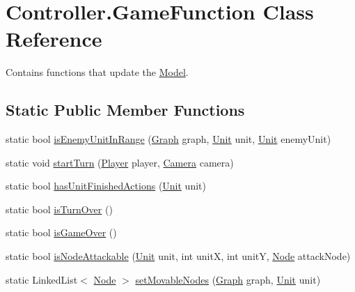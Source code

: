 \hypertarget{class_controller_1_1_game_function}{}\section{Controller.\+Game\+Function Class Reference}
\label{class_controller_1_1_game_function}


Contains functions that update the \hyperlink{namespace_model}{Model}.  


\subsection*{Static Public Member Functions}
\begin{DoxyCompactItemize}
\item 
static bool \hyperlink{class_controller_1_1_game_function_a0e573edb9537563b1ef6a854739c5517}{is\+Enemy\+Unit\+In\+Range} (\hyperlink{class_model_1_1_map_module_1_1_graph}{Graph} graph, \hyperlink{interface_model_1_1_unit_module_1_1_unit}{Unit} unit, \hyperlink{interface_model_1_1_unit_module_1_1_unit}{Unit} enemy\+Unit)
\item 
static void \hyperlink{class_controller_1_1_game_function_acb3bb5d76c1fb5a794e228da98c39009}{start\+Turn} (\hyperlink{class_model_1_1_player}{Player} player, \hyperlink{class_view_1_1_camera}{Camera} camera)
\item 
static bool \hyperlink{class_controller_1_1_game_function_ac23bfd530d3a087da49065fce84821ab}{has\+Unit\+Finished\+Actions} (\hyperlink{interface_model_1_1_unit_module_1_1_unit}{Unit} unit)
\item 
static bool \hyperlink{class_controller_1_1_game_function_ad685bf2e60bc063664f47ac2cc1fc385}{is\+Turn\+Over} ()
\item 
static bool \hyperlink{class_controller_1_1_game_function_a0696007a9d80f8e6ae9b28b3a3ba4b43}{is\+Game\+Over} ()
\item 
static bool \hyperlink{class_controller_1_1_game_function_a0878926921f4745c61645234142819ff}{is\+Node\+Attackable} (\hyperlink{interface_model_1_1_unit_module_1_1_unit}{Unit} unit, int unitX, int unitY, \hyperlink{class_model_1_1_map_module_1_1_node}{Node} attack\+Node)
\item 
static Linked\+List$<$ \hyperlink{class_model_1_1_map_module_1_1_node}{Node} $>$ \hyperlink{class_controller_1_1_game_function_a9910af0161e502a272fa6fbc025d6a93}{set\+Movable\+Nodes} (\hyperlink{class_model_1_1_map_module_1_1_graph}{Graph} graph, \hyperlink{interface_model_1_1_unit_module_1_1_unit}{Unit} unit)

\end{DoxyCompactItemize}

